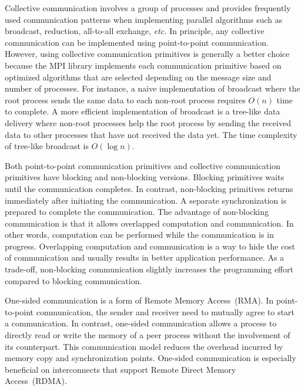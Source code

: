 Collective communication involves a group of processes and provides frequently
used communication patterns when implementing parallel algorithms such as
broadcast, reduction, all-to-all exchange, \emph{etc.} In principle, any
collective communication can be implemented using point-to-point
communication. However, using collective communication primitives is generally
a better choice because the MPI library implements each communication
primitive based on optimized algorithms that are selected depending on the
message size and number of processes. For instance, a naive implementation of
broadcast where the root process sends the same data to each non-root process
requires $O(n)$ time to complete. A more efficient implementation of broadcast
is a tree-like data delivery where non-root processes help the root process by
sending the received data to other processes that have not received the data
yet. The time complexity of tree-like broadcast is $O(\log n)$.

Both point-to-point communication primitives and collective communication
primitives have blocking and non-blocking versions. Blocking
primitives waits until the communication completes. In contrast,
non-blocking primitives returns immediately after initiating the
communication. A separate synchronization is prepared to complete the
communication. The advantage of non-blocking communication is that it allows
overlapped computation and communication. In other words, computation can be
performed while the communication is in progress. Overlapping computation and
communication is a way to hide the cost of communication and usually results
in better application performance. As a trade-off, non-blocking communication
slightly increases the programming effort compared to blocking communication.

One-sided communication is a form of Remote Memory Access~(RMA). In
point-to-point communication, the sender and receiver need to mutually agree
to start a communication. In contrast, one-sided communication allows
a process to directly read or write the memory of a peer process without the
involvement of its counterpart. This communication model reduces the overhead
incurred by memory copy and synchronization points. One-sided communication is
especially beneficial on interconnects that support Remote Direct Memory
Access~(RDMA).


